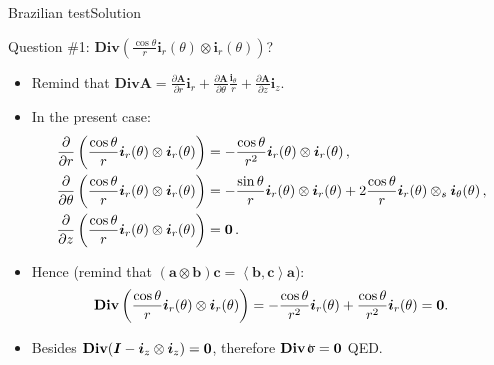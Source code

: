 \documentclass{beamer}
\newcommand{\Id}{{\boldsymbol I}}
\newcommand{\aj}{a}
\newcommand{\bj}{b}
\newcommand{\cj}{c}
\newcommand{\av}{{\boldsymbol\aj}}
\newcommand{\bv}{{\boldsymbol\bj}}
\newcommand{\cv}{{\boldsymbol\cj}}
\newcommand{\zj}{z}
\newcommand{\Aj}{A}
\newcommand{\Av}{{\boldsymbol\Aj}}
\newcommand{\Div}{\mathbf{Div}}
\renewcommand{\ij}{i}
\newcommand{\iv}{{\boldsymbol\ij}}
\newcommand*{\stress}{\mbox{$\hspace{0.3em}\rotatebox[x=0pt,y=0.2pt]{90}{\rule{0.017\linewidth}{0.4pt}}\hspace{-0.25em}\upsigma$}}
\newcommand{\bzero}{{\bf 0}}
\newcommand{\scal}[1]{\left\langle{#1}\right\rangle}
\begin{document}
\begin{frame}{Brazilian test}{Solution}
\begin{overprint}
\vskip-20pt
\begin{exampleblock}{Question \#1: $\Div(\frac{\cos\theta}{r}\iv_r(\theta)\otimes\iv_r(\theta))$?}
\begin{itemize}
\item Remind that $\Div\Av=\frac{\partial\Av}{\partial r}\iv_r+\frac{\partial\Av}{\partial\theta}\frac{\iv_\theta}{r}+\frac{\partial\Av}{\partial\zj}\iv_\zj$.
\item In the present case:
{\scriptsize
\begin{displaymath}
\begin{split}
\frac{\partial}{\partial r}\left(\frac{\cos\theta}{r}\iv_r(\theta)\otimes\iv_r(\theta)\right) &=-\frac{\cos\theta}{r^2}\iv_r(\theta)\otimes\iv_r(\theta)\,, \\
\frac{\partial}{\partial\theta}\left(\frac{\cos\theta}{r}\iv_r(\theta)\otimes\iv_r(\theta)\right) &=-\frac{\sin\theta}{r}\iv_r(\theta)\otimes\iv_r(\theta)+2\frac{\cos\theta}{r}\iv_r(\theta)\otimes_s\iv_\theta(\theta)\,, \\
\frac{\partial}{\partial\zj}\left(\frac{\cos\theta}{r}\iv_r(\theta)\otimes\iv_r(\theta)\right) &=\bzero\,.
\end{split}
\end{displaymath}}
\item Hence (remind that $(\av\otimes\bv)\cv=\scal{\bv,\cv}\av$):
{\scriptsize
\begin{displaymath}
\Div\left(\frac{\cos\theta}{r}\iv_r(\theta)\otimes\iv_r(\theta)\right)=-\frac{\cos\theta}{r^2}\iv_r(\theta)+\frac{\cos\theta}{r^2}\iv_r(\theta)=\bzero.
\end{displaymath}}
\item Besides $\Div(\Id-\iv_\zj\otimes\iv_\zj)=\bzero$, therefore $\Div\stress=\bzero$ QED.
\end{itemize}
\end{exampleblock}

\end{overprint}

\end{frame}
\end{document}
